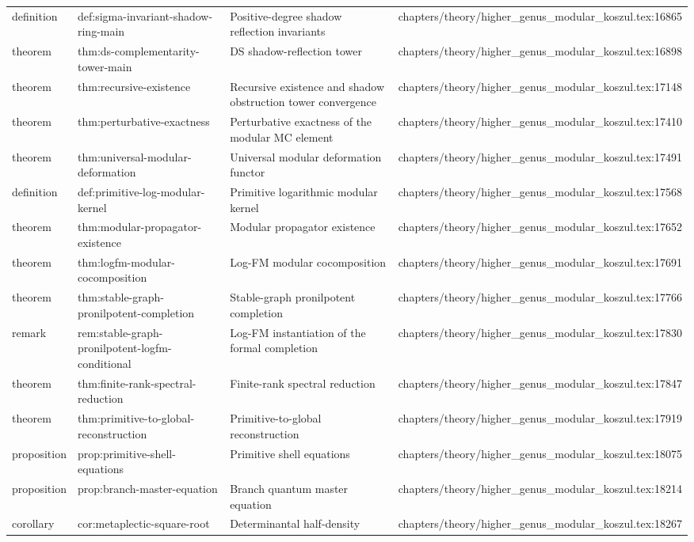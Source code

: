 \documentclass[11pt]{article}
\begin{document}
\begin{longtable}{L{0.10\textwidth}L{0.26\textwidth}L{0.42\textwidth}L{0.22\textwidth}}
definition & def:sigma-invariant-shadow-ring-main & Positive-degree shadow reflection invariants & chapters/theory/higher\_genus\_modular\_koszul.tex:16865\\
theorem & thm:ds-complementarity-tower-main & DS shadow-reflection tower & chapters/theory/higher\_genus\_modular\_koszul.tex:16898\\
theorem & thm:recursive-existence & Recursive existence and shadow obstruction tower convergence & chapters/theory/higher\_genus\_modular\_koszul.tex:17148\\
theorem & thm:perturbative-exactness & Perturbative exactness of the modular MC element & chapters/theory/higher\_genus\_modular\_koszul.tex:17410\\
theorem & thm:universal-modular-deformation & Universal modular deformation functor & chapters/theory/higher\_genus\_modular\_koszul.tex:17491\\
definition & def:primitive-log-modular-kernel & Primitive logarithmic modular kernel & chapters/theory/higher\_genus\_modular\_koszul.tex:17568\\
theorem & thm:modular-propagator-existence & Modular propagator existence & chapters/theory/higher\_genus\_modular\_koszul.tex:17652\\
theorem & thm:logfm-modular-cocomposition & Log-FM modular cocomposition & chapters/theory/higher\_genus\_modular\_koszul.tex:17691\\
theorem & thm:stable-graph-pronilpotent-completion & Stable-graph pronilpotent completion & chapters/theory/higher\_genus\_modular\_koszul.tex:17766\\
remark & rem:stable-graph-pronilpotent-logfm-cond{}itional & Log-FM instantiation of the formal completion & chapters/theory/higher\_genus\_modular\_koszul.tex:17830\\
theorem & thm:finite-rank-spectral-reduction & Finite-rank spectral reduction & chapters/theory/higher\_genus\_modular\_koszul.tex:17847\\
theorem & thm:primitive-to-global-reconstruction & Primitive-to-global reconstruction & chapters/theory/higher\_genus\_modular\_koszul.tex:17919\\
proposition & prop:primitive-shell-equations & Primitive shell equations & chapters/theory/higher\_genus\_modular\_koszul.tex:18075\\
proposition & prop:branch-master-equation & Branch quantum master equation & chapters/theory/higher\_genus\_modular\_koszul.tex:18214\\
corollary & cor:metaplectic-square-root & Determinantal half-density & chapters/theory/higher\_genus\_modular\_koszul.tex:18267\\

\end{longtable}
\end{document}
